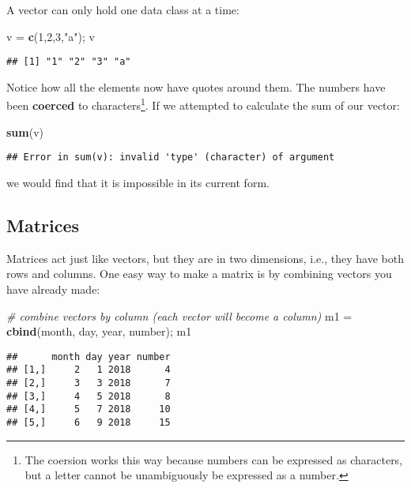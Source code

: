 \documentclass[]{book}
\newenvironment{Shaded}{\begin{snugshade}}{\end{snugshade}}
\newcommand{\KeywordTok}[1]{\textcolor[rgb]{0.13,0.29,0.53}{\textbf{#1}}}
\newcommand{\DecValTok}[1]{\textcolor[rgb]{0.00,0.00,0.81}{#1}}
\newcommand{\StringTok}[1]{\textcolor[rgb]{0.31,0.60,0.02}{#1}}
\newcommand{\CommentTok}[1]{\textcolor[rgb]{0.56,0.35,0.01}{\textit{#1}}}
\newcommand{\NormalTok}[1]{#1}
\let\rmarkdownfootnote\footnote%
\def\footnote{\protect\rmarkdownfootnote}
\theoremstyle{definition}
\theoremstyle{definition}
\theoremstyle{definition}
\theoremstyle{remark}
\begin{document}
A vector can only hold one data class at a time:

\begin{Shaded}
\begin{Highlighting}[]
\NormalTok{v =}\StringTok{ }\KeywordTok{c}\NormalTok{(}\DecValTok{1}\NormalTok{,}\DecValTok{2}\NormalTok{,}\DecValTok{3}\NormalTok{,}\StringTok{"a"}\NormalTok{); v}
\end{Highlighting}
\end{Shaded}

\begin{verbatim}
## [1] "1" "2" "3" "a"
\end{verbatim}

Notice how all the elements now have quotes around them. The numbers
have been \textbf{coerced} to characters\footnote{The coersion works
  this way because numbers can be expressed as characters, but a letter
  cannot be unambiguously be expressed as a number.}. If we attempted to
calculate the sum of our vector:

\begin{Shaded}
\begin{Highlighting}[]
\KeywordTok{sum}\NormalTok{(v)}
\end{Highlighting}
\end{Shaded}

\begin{verbatim}
## Error in sum(v): invalid 'type' (character) of argument
\end{verbatim}

we would find that it is impossible in its current form.

\subsection{Matrices}\label{matrices}

Matrices act just like vectors, but they are in two dimensions, i.e.,
they have both rows and columns. One easy way to make a matrix is by
combining vectors you have already made:

\begin{Shaded}
\begin{Highlighting}[]
\CommentTok{# combine vectors by column (each vector will become a column)}
\NormalTok{m1 =}\StringTok{ }\KeywordTok{cbind}\NormalTok{(month, day, year, number); m1}
\end{Highlighting}
\end{Shaded}

\begin{verbatim}
##      month day year number
## [1,]     2   1 2018      4
## [2,]     3   3 2018      7
## [3,]     4   5 2018      8
## [4,]     5   7 2018     10
## [5,]     6   9 2018     15
\end{verbatim}
\end{document}
